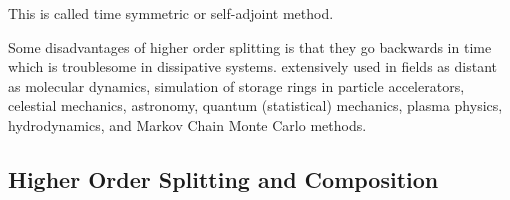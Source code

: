 This is called time symmetric or self-adjoint method.

Some disadvantages of higher order splitting is that they go backwards in time which is troublesome in dissipative systems. extensively used in fields as distant as molecular dynamics, simulation of storage rings in particle accelerators, celestial mechanics, astronomy, quantum (statistical) mechanics, plasma physics, hydrodynamics, and Markov Chain Monte Carlo methods.

\subsection{Higher Order Splitting and Composition}
